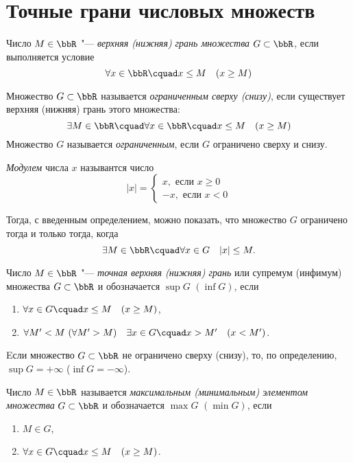 \section{Точные грани числовых множеств}
\begin{defn}
Число $M \in \bbR$ "--- \textit{верхняя (нижняя) грань множества} $G\subset \bbR$, если выполняется условие 
$$
\forall x \in \bbR \cquad x \le M \quad (x \ge M)
$$
\end{defn}
\begin{defn}
Множество $G\subset \bbR$ называется \textit{ограниченным сверху (снизу)}, если существует верхняя (нижняя) грань этого множества:
$$
\exists M \in \bbR \cquad \forall x \in \bbR \cquad x \le M \quad (x \ge M)
$$
Множество $G$ называется \textit{ограниченным}, если $G$ ограничено сверху и снизу.
\end{defn}
\begin{defn}
\textit{Модулем} числа $x$ назывантся число 
$$
|x|=\begin{cases}x, \text{ если }x\ge 0\\-x,\text{ если }x<0\end{cases}
$$
\end{defn}
Тогда, с введенным определением, можно показать, что множество $G$ ограничено тогда и только тогда, когда 
$$
\exists M \in \bbR \cquad \forall x \in G \quad |x| \le M.
$$
\begin{defn}
Число $M \in \bbR$ "--- \textit{точная верхняя (нижняя) грань} или {супремум (инфимум) множества} $G \subset \bbR$ и обозначается $\sup G$ $(\inf G)$, если 
\begin{enumerate}
\item
$\forall x \in G\cquad x \le M \quad (x\ge M)$,
\item
$\forall M' < M \ (\forall M' > M)\quad \exists x\in G\cquad x>M' \quad (x<M')$.
\end{enumerate}
\end{defn}

Eсли множество $G \subset \bbR$ не ограничено сверху (снизу), то, по определению, $\sup G=+\infty$ ($\inf G=-\infty$).  

\begin{defn}
Число $M \in \bbR$ называется \textit{максимальным (минимальным) элементом множества} $G \subset \bbR$ и обозначается $\max G$ $(\min G)$, если 
\begin{enumerate}
\item
$M\in G$,
\item
$\forall x \in G\cquad x \le M \quad (x \ge M)$.
\end{enumerate}
\end{defn}



